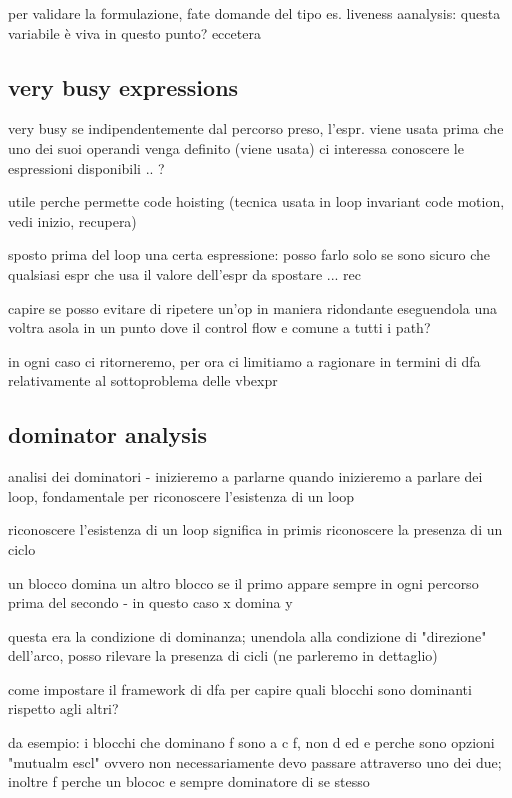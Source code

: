 per validare la formulazione, fate domande del tipo es. liveness aanalysis: questa variabile \`e viva in questo punto? eccetera

\subsection{very busy expressions}

very busy se indipendentemente dal percorso preso, l'espr. viene usata prima che uno dei suoi operandi venga definito (viene usata)
ci interessa conoscere le espressioni disponibili .. ?

utile perche permette code hoisting (tecnica usata in loop invariant code motion, vedi inizio, recupera)

sposto prima del loop una certa espressione: posso farlo solo se sono sicuro che qualsiasi espr che usa il valore dell'espr da spostare ... rec

capire se posso evitare di ripetere un'op in maniera ridondante eseguendola una voltra asola in un punto dove il control flow e comune a tutti i path?

in ogni caso ci ritorneremo, per ora ci limitiamo a ragionare in termini di dfa relativamente al sottoproblema delle vbexpr

\subsection{dominator analysis}

analisi dei dominatori - inizieremo a parlarne quando inizieremo a parlare dei loop, fondamentale per riconoscere l'esistenza di un loop

riconoscere l'esistenza di un loop significa in primis riconoscere la presenza di un ciclo

un blocco domina un altro blocco se il primo appare sempre in ogni percorso prima del secondo - in questo caso x domina y

questa era la condizione di dominanza; unendola alla condizione di "direzione" dell'arco, posso rilevare la presenza di cicli (ne parleremo in dettaglio)

come impostare il framework di dfa per capire quali blocchi sono dominanti rispetto agli altri?

da esempio: i blocchi che dominano f sono a c f, non d ed e perche sono opzioni "mutualm escl" ovvero non necessariamente devo passare attraverso uno dei due; inoltre f perche un blococ e sempre dominatore di se stesso

